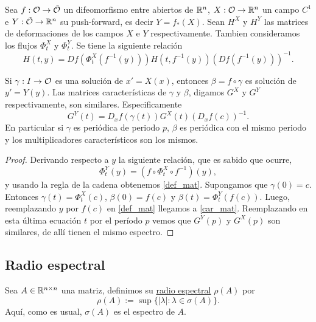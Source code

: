  
 

 \begin{teorema}



Sea $f:\mathcal{O}\to\tilde{\mathcal{O}}$ un difeomorfismo entre abiertos de $\mathbb{R}^n$, $X:\mathcal{O}\to\mathbb{R}^n$ un campo $C^1$ e $Y:\tilde{\mathcal{O}}\to\mathbb{R}^n$ su push-forward, es decir $Y=f_*(X)$.
Sean $H^X$ y $H^Y$ las matrices de deformaciones de los campos $X$ e $Y$ respectivamente. Tambien consideramos los flujos $\Phi_t^X$ y $\Phi_t^Y$. Se tiene la siguiente 
relación
\begin{equation}\label{def_mat}H(t,y)=Df(\Phi^X_t(f^{-1}(y)))H(t,f^{-1}(y)) \left(Df(f^{-1}(y))\right)^{-1}.\end{equation}


Si $\gamma:I\to\mathcal{O}$ es una solución de $x'=X(x)$, entonces $\beta=f\circ\gamma$ es solución de $y'=Y(y)$. Las matrices características 
de $\gamma$ y $\beta$, digamos  $G^X$ y $G^Y$ respectivamente, son similares. Especificamente
\begin{equation}\label{car_mat}G^Y(t)=D_xf(\gamma(t))G^X(t)\left(D_xf(c)\right)^{-1}.\end{equation}
En particular si $\gamma$ es periódica de periodo $p$, $\beta$ es periódica con el mismo periodo y los multiplicadores característicos son los mismos.

 \end{teorema}


 
\begin{proof}
 Derivando respecto a $y$ la siguiente relación, que es sabido que ocurre,
\[\Phi_t^Y(y)=(f\circ \Phi^X_t\circ f^{-1})(y),\]
y usando la regla de la cadena obtenemos \eqref{def_mat}. Supongamos que $\gamma(0)=c$. Entonces $\gamma(t)=\Phi^X_t(c)$, $\beta(0)=f(c)$ y $\beta(t)=\Phi_t^Y(f(c))$. 
Luego, reemplazando $y$ por $f(c)$ en \eqref{def_mat} llegamos a  \eqref{car_mat}.  Reemplazando en esta última ecuación $t$ por el período $p$ vemos que $G^Y(p)$ y $G^X(p)$
son similares, de allí tienen el mismo espectro.\end{proof}
 
 
 \subsection{Radio espectral}

\begin{definicion} Sea $A\in\mathbb{R}^{n\times n}$ una matriz, definimos su
\href{http://es.wikipedia.org/wiki/Radio_espectral}{radio espectral} $\rho(A)$ por
\[
\rho(A):= \sup\{|\lambda|: \lambda\in\sigma(A)\}.
\]
Aquí, como es usual, $\sigma(A)$ es el espectro de $A$.

 \end{definicion}





